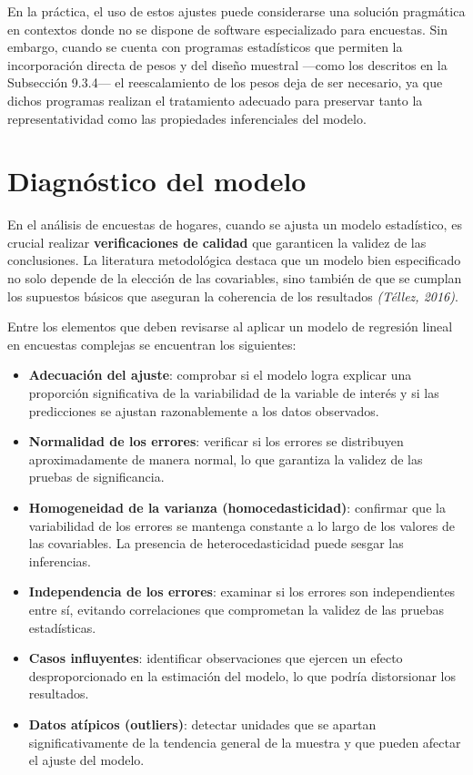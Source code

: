 \documentclass[
  12pt,
]{book}
\providecommand{\tightlist}{%
  \setlength{\itemsep}{0pt}\setlength{\parskip}{0pt}}
\begin{document}
En la práctica, el uso de estos ajustes puede considerarse una solución pragmática en contextos donde no se dispone de software especializado para encuestas. Sin embargo, cuando se cuenta con programas estadísticos que permiten la incorporación directa de pesos y del diseño muestral ---como los descritos en la Subsección 9.3.4--- el reescalamiento de los pesos deja de ser necesario, ya que dichos programas realizan el tratamiento adecuado para preservar tanto la representatividad como las propiedades inferenciales del modelo.

\section{Diagnóstico del modelo}\label{diagnuxf3stico-del-modelo}

En el análisis de encuestas de hogares, cuando se ajusta un modelo estadístico, es crucial realizar \textbf{verificaciones de calidad} que garanticen la validez de las conclusiones. La literatura metodológica destaca que un modelo bien especificado no solo depende de la elección de las covariables, sino también de que se cumplan los supuestos básicos que aseguran la coherencia de los resultados \emph{(Téllez, 2016)}.

Entre los elementos que deben revisarse al aplicar un modelo de regresión lineal en encuestas complejas se encuentran los siguientes:

\begin{itemize}
\tightlist
\item
  \textbf{Adecuación del ajuste}: comprobar si el modelo logra explicar una proporción significativa de la variabilidad de la variable de interés y si las predicciones se ajustan razonablemente a los datos observados.
\item
  \textbf{Normalidad de los errores}: verificar si los errores se distribuyen aproximadamente de manera normal, lo que garantiza la validez de las pruebas de significancia.
\item
  \textbf{Homogeneidad de la varianza (homocedasticidad)}: confirmar que la variabilidad de los errores se mantenga constante a lo largo de los valores de las covariables. La presencia de heterocedasticidad puede sesgar las inferencias.
\item
  \textbf{Independencia de los errores}: examinar si los errores son independientes entre sí, evitando correlaciones que comprometan la validez de las pruebas estadísticas.
\item
  \textbf{Casos influyentes}: identificar observaciones que ejercen un efecto desproporcionado en la estimación del modelo, lo que podría distorsionar los resultados.
\item
  \textbf{Datos atípicos (outliers)}: detectar unidades que se apartan significativamente de la tendencia general de la muestra y que pueden afectar el ajuste del modelo.
\end{itemize}
\end{document}
